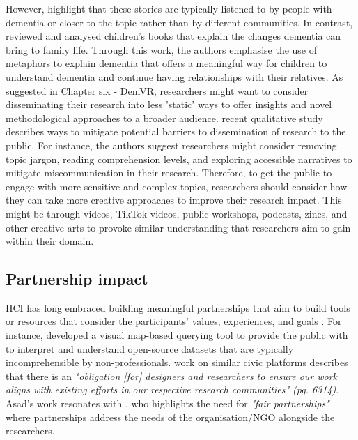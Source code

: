 However, \cite{woodall2016independent} highlight that these stories are typically listened to by people with dementia or closer to the topic rather than by different communities. In contrast, \cite{caldwell2021depicting} reviewed and analysed children's books that explain the changes dementia can bring to family life. Through this work, the authors emphasise the use of metaphors to explain dementia that offers a meaningful way for children to understand dementia and continue having relationships with their relatives. As suggested in Chapter six - DemVR, researchers might want to consider disseminating their research into less 'static' ways to offer insights and novel methodological approaches to a broader audience. \cite{smith2020disseminating} recent qualitative study describes ways to mitigate potential barriers to dissemination of research to the public. For instance, the authors suggest researchers might consider removing topic jargon, reading comprehension levels, and exploring accessible narratives to mitigate miscommunication in their research. Therefore, to get the public to engage with more sensitive and complex topics, researchers should consider how they can take more creative approaches to improve their research impact. This might be through videos, TikTok videos, public workshops, podcasts, zines, and other creative arts to provoke similar understanding that researchers aim to gain within their domain.

\subsection{Partnership impact}
HCI has long embraced building meaningful partnerships that aim to build tools or resources that consider the participants' values, experiences, and goals \citep{vines_configuring_2013}. For instance, \cite{puussaar_making_2018} developed a visual map-based querying tool to provide the public with to interpret and understand open-source datasets that are typically incomprehensible by non-professionals. \cite{asad_tap_2017} work on similar civic platforms describes that there is an \textit{"obligation [for] designers and researchers to ensure our work aligns with existing efforts in our respective research communities" (pg. 6314)}. Asad's work resonates with \cite{gitau2009fair}, who highlights the need for \textit{"fair partnerships"} where partnerships address the needs of the organisation/NGO alongside the researchers.

